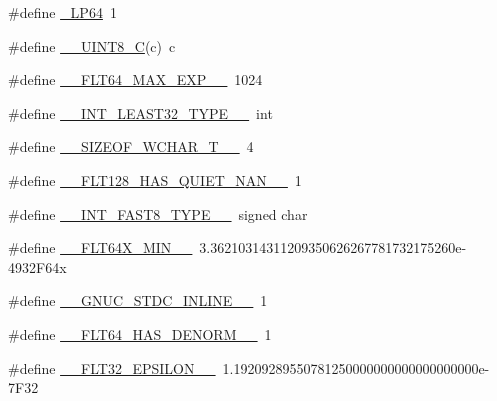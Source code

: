 \begin{DoxyCompactItemize}
\item 
\#define \hyperlink{cmake-build-debug_2babel__client__autogen_2moc__predefs_8h_a02ee5c8ce8c3a0262b18d716cdeb2d1d}{\+\_\+\+L\+P64}~1
\item 
\#define \hyperlink{cmake-build-debug_2babel__client__autogen_2moc__predefs_8h_a23cc29e487b9acd9261adc6c71c1ff0e}{\+\_\+\+\_\+\+U\+I\+N\+T8\+\_\+C}(c)~c
\item 
\#define \hyperlink{cmake-build-debug_2babel__client__autogen_2moc__predefs_8h_ad0c5a78bb2815c2ca02963343d1751a8}{\+\_\+\+\_\+\+F\+L\+T64\+\_\+\+M\+A\+X\+\_\+\+E\+X\+P\+\_\+\+\_\+}~1024
\item 
\#define \hyperlink{cmake-build-debug_2babel__client__autogen_2moc__predefs_8h_a401f5f43b9e96d82152bf7cec0be6dfd}{\+\_\+\+\_\+\+I\+N\+T\+\_\+\+L\+E\+A\+S\+T32\+\_\+\+T\+Y\+P\+E\+\_\+\+\_\+}~int
\item 
\#define \hyperlink{cmake-build-debug_2babel__client__autogen_2moc__predefs_8h_a5cc6a3e1680136db2b5e60c2fb703d99}{\+\_\+\+\_\+\+S\+I\+Z\+E\+O\+F\+\_\+\+W\+C\+H\+A\+R\+\_\+\+T\+\_\+\+\_\+}~4
\item 
\#define \hyperlink{cmake-build-debug_2babel__client__autogen_2moc__predefs_8h_a70ffee09638ac75a263b1a2e5a473c85}{\+\_\+\+\_\+\+F\+L\+T128\+\_\+\+H\+A\+S\+\_\+\+Q\+U\+I\+E\+T\+\_\+\+N\+A\+N\+\_\+\+\_\+}~1
\item 
\#define \hyperlink{cmake-build-debug_2babel__client__autogen_2moc__predefs_8h_a3783fd947621ab5304708e78da5bd6d3}{\+\_\+\+\_\+\+I\+N\+T\+\_\+\+F\+A\+S\+T8\+\_\+\+T\+Y\+P\+E\+\_\+\+\_\+}~signed char
\item 
\#define \hyperlink{cmake-build-debug_2babel__client__autogen_2moc__predefs_8h_a7958d6a294134e4e73756f7361994c1f}{\+\_\+\+\_\+\+F\+L\+T64\+X\+\_\+\+M\+I\+N\+\_\+\+\_\+}~3.\+36210314311209350626267781732175260e-\/4932\+F64x
\item 
\#define \hyperlink{cmake-build-debug_2babel__client__autogen_2moc__predefs_8h_ad22737f11009b4bf60ba233eee7420dd}{\+\_\+\+\_\+\+G\+N\+U\+C\+\_\+\+S\+T\+D\+C\+\_\+\+I\+N\+L\+I\+N\+E\+\_\+\+\_\+}~1
\item 
\#define \hyperlink{cmake-build-debug_2babel__client__autogen_2moc__predefs_8h_a9e0564ada348dff0b4436b156412f430}{\+\_\+\+\_\+\+F\+L\+T64\+\_\+\+H\+A\+S\+\_\+\+D\+E\+N\+O\+R\+M\+\_\+\+\_\+}~1
\item 
\#define \hyperlink{cmake-build-debug_2babel__client__autogen_2moc__predefs_8h_af9e0be24f061961e062774ce018a8d3a}{\+\_\+\+\_\+\+F\+L\+T32\+\_\+\+E\+P\+S\+I\+L\+O\+N\+\_\+\+\_\+}~1.\+19209289550781250000000000000000000e-\/7\+F32

\end{DoxyCompactItemize}
